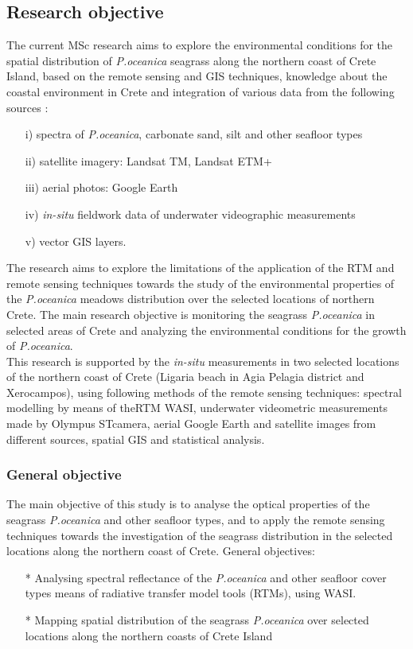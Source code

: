\documentclass[11pt]{article}
\begin{document}
\subsection{Research objective}
The current MSc research aims to explore the environmental conditions for the spatial distribution of \textit{P.oceanica} seagrass along the northern coast of Crete Island, based on the remote sensing and \ac{GIS} techniques, knowledge about the coastal environment in Crete and integration of various data
from the following sources :
	\begin{itemize}
		\item[] i) spectra of \textit{P.oceanica}, carbonate sand, silt and other seafloor types
		\item[] ii) satellite imagery: Landsat TM, Landsat ETM+
		\item[] iii) aerial photos: Google Earth
		\item[] iv) \textit{in-situ} fieldwork data of underwater videographic measurements
		\item[] v) vector GIS layers.
	\end{itemize}
The research aims to explore the limitations of the application of the \ac{RTM} and remote sensing techniques 
towards the study of the environmental properties of the \textit{P.oceanica} meadows distribution
over the selected locations of northern Crete. The main research objective is monitoring the seagrass \textit{P.oceanica} in selected areas of Crete and analyzing the environmental conditions for the growth of \textit{P.oceanica}. \\
This research is supported by the \textit{in-situ} measurements in two selected locations of the northern coast
of Crete (Ligaria beach in Agia Pelagia district and Xerocampos), using following methods of the
remote sensing techniques: spectral modelling by means of the\ac{RTM} \ac{WASI},  underwater videometric measurements made by \ac{Olympus ST}camera, aerial Google Earth and satellite images from different sources, spatial \ac{GIS} and statistical analysis.

\subsubsection{General objective}
The main objective of this study is to analyse the optical properties of the seagrass \textit{P.oceanica} and other seafloor types, and to apply the remote sensing techniques towards the investigation of the seagrass distribution in the selected locations along the northern coast of Crete.
General objectives:
	\begin{itemize}
		\item[*]Analysing spectral reflectance of the \textit{P.oceanica} and other seafloor cover types means of radiative transfer model tools (RTMs), using WASI.
		\item[*]Mapping spatial distribution of the seagrass \textit{P.oceanica} over selected locations along the northern coasts of Crete Island 
	\end{itemize}
\end{document}
